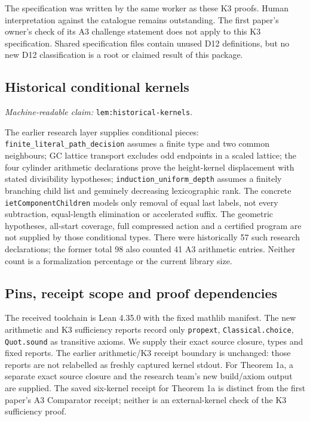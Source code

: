 \documentclass[11pt]{amsart}
\newcommand{\record}[1]{\nolinkurl{#1}}
\newcommand{\claimid}[1]{\par\nopagebreak\noindent\textit{Machine-readable claim:} \record{#1}.\par}
\theoremstyle{definition}\newtheorem{definition}{Definition}
\begin{document}
The specification was written by the same worker as these K3 proofs.
Human interpretation against the catalogue remains outstanding. The
first paper's owner's check of its A3 challenge statement does not
apply to this K3 specification. Shared specification files contain
unused D12 definitions, but no new D12 classification is a root or
claimed result of this package.

\subsection{Historical conditional kernels}\label{sec:historical-formal}
\label{lem:historical-kernels}\claimid{lem:historical-kernels}
The earlier research layer supplies conditional pieces:
\record{finite_literal_path_decision} assumes a finite type and two
common neighbours; GC lattice transport excludes odd endpoints in a
scaled lattice; the four cylinder arithmetic declarations prove the
height-kernel displacement with stated divisibility hypotheses;
\record{induction_uniform_depth} assumes a finitely branching child
list and genuinely decreasing lexicographic rank. The concrete
\record{ietComponentChildren} models only removal of equal last labels,
not every subtraction, equal-length elimination or accelerated suffix.
The geometric hypotheses, all-start coverage, full compressed action
and a certified program are not supplied by those conditional types.
There were historically 57 such research declarations; the former
total 98 also counted 41 A3 arithmetic entries. Neither count is a
formalization percentage or the current library size.

\subsection{Pins, receipt scope and proof dependencies}\label{sec:formal-records}
The received toolchain is Lean 4.35.0 with the fixed mathlib manifest.
The new arithmetic and K3 sufficiency reports record only
\record{propext}, \record{Classical.choice}, \record{Quot.sound} as
transitive axioms. We supply their exact source closure, types and
fixed reports. The earlier arithmetic/K3 receipt boundary is unchanged:
those reports are not relabelled as freshly captured kernel stdout.
For Theorem 1a, a separate exact source closure and the research team's
new build/axiom output are supplied. The saved six-kernel receipt for
Theorem 1a is distinct from the first paper's A3 Comparator receipt;
neither is an external-kernel check of the K3 sufficiency proof.
\end{document}
